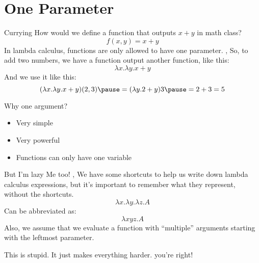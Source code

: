 \section{One Parameter}
\begin{namedframe}{Currying}
	How would we define a function that outputs $x + y$ in math class?
	\pause
	\[f(x, y) = x + y\]
	\pause
	In lambda calculus, functions are only allowed to have \alert{one} parameter.
	\sep
	So, to add two numbers, we have a function output another function, like this:
	\[\lambda x . \lambda y . x + y\]
	And we use it like this:
	\[(\lambda x . \lambda y . x + y) (2, 3) \pause = (\lambda y . 2 + y) 3 \pause = 2 + 3 = 5\]
\end{namedframe}
\begin{namedframe}{Why one argument?}
	\begin{itemize}[<+->]
		\item Very simple
		\item Very powerful
		\item Functions can only have one variable
	\end{itemize}
\end{namedframe}
\begin{namedframe}{But I'm lazy}
	Me too!
	\sep
	We have some shortcuts to help us write down lambda calculus expressions, but it's important to remember what they represent, without the shortcuts.
	\pause
	\[\lambda x . \lambda y . \lambda z . A\]
	Can be abbreviated as:
	\[\lambda xyz . A\]
	\pause
	Also, we assume that we evaluate a function with ``multiple'' arguments starting with the leftmost parameter.
\end{namedframe}
\begin{namedframe}{This is stupid. It just makes everything harder.}
	you're right!

\end{namedframe}
